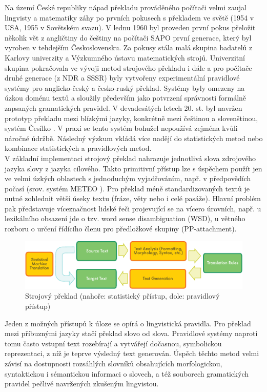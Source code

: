\begin{multicols}{2}
Na území České republiky nápad překladu prováděného počítači velmi zaujal lingvisty a matematiky záhy po prvních pokusech s překladem ve světě (1954 v USA, 1955 v Sovětském svazu). V lednu 1960 byl proveden první pokus přeložit několik vět z angličtiny do češtiny na počítači SAPO první generace, který byl vyroben v tehdejším Československu. Za pokusy stála malá skupina badatelů z Karlovy univerzity a Výzkumného ústavu matematických strojů. Univerzitní skupina pokračovala ve vývoji metod strojového překladu i dále a pro počítače druhé generace (z NDR a SSSR) byly vytvořeny experimentální pravidlové systémy pro anglicko-český a česko-ruský překlad. Systémy byly omezeny na úzkou doménu textů a sloužily především jako potvrzení správnosti formálně zapsaných gramatických pravidel. V devadesátých letech 20. st. byl navržen prototyp překladu mezi blízkými jazyky, konkrétně mezi češtinou a slovenštinou, systém Česílko \cite{Note18}. V praxi se tento systém bohužel nepoužívá zejména kvůli náročné údržbě. Následný výzkum vkládá více nadějí do statistických metod nebo kombinace statistických a pravidlových metod.\\
V základní implementaci strojový překlad nahrazuje jednotlivá slova zdrojového jazyka slovy z jazyka cílového. Takto primitivní přístup lze s úspěchem použít jen ve velmi úzkých oblastech s jednoduchým vyjadřováním, např. v předpovědích počasí (srov. systém METEO \cite{Note19}). Pro překlad méně standardizovaných textů je nutné zohlednit větší úseky textu (fráze, věty nebo i celé pasáže). Hlavní problém pak představuje víceznačnost lidské řeči projevující se na vícero úrovních, např. u lexikálního obsazení jde o tzv. word sense disambiguation (WSD), u větného rozboru o určení řídícího členu pro předložkové skupiny (PP-attachment).
\begin{figure}[htb]
  \center
  \includegraphics[width=\textwidth]{../_media/english/machine_translation}
  \caption{Strojový překlad (nahoře: statistický přístup, dole: pravidlový přístup)}
  \label{fig:mtarch_en}
\end{figure}
Jeden z možných přístupů k úloze se opírá o lingvistická pravidla. Pro překlad mezi příbuznými jazyky stačí překlad slovo od slova. Pravidlové systémy naproti tomu často vstupní text rozebírají a vytvářejí dočasnou, symbolickou reprezentaci, z níž je teprve výsledný text generován. Úspěch těchto metod velmi závisí na dostupnosti rozsáhlých slovníků obsahujících morfologickou, syntaktickou i sémantickou informaci o slovech, a též souborech gramatických pravidel pečlivě navržených zkušeným lingvistou.\\

\end{multicols}
